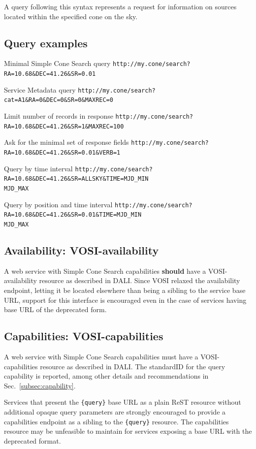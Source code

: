 \documentclass[11pt,a4paper]{ivoa} 
\begin{document}
A query following this syntax represents a request for information on
sources located within the specified cone on the sky.

\subsection{Query examples} \begin{bigdescription} \item[Minimal Simple
Cone Search query]
\nolinkurl{http://my.cone/search?RA=10.68\&DEC=41.26\&SR=0.01}
\item[Service Metadata query]
\nolinkurl{http://my.cone/search?cat=A1\&RA=0\&DEC=0\&SR=0\&MAXREC=0}
\item[Limit number of records in response]
\nolinkurl{http://my.cone/search?RA=10.68\&DEC=41.26\&SR=1\&MAXREC=100}
\item[Ask for the minimal set of response fields]
\nolinkurl{http://my.cone/search?RA=10.68\&DEC=41.26\&SR=0.01\&VERB=1}
\item[Query by time
interval]\nolinkurl{http://my.cone/search?RA=10.68\&DEC=41.26\&SR=ALLSKY&TIME=MJD\_MIN
MJD\_MAX} \item[Query by position and time
interval]\nolinkurl{http://my.cone/search?RA=10.68\&DEC=41.26\&SR=0.01&TIME=MJD\_MIN
MJD\_MAX} \end{bigdescription}

\subsection{Availability: VOSI-availability} A web service with Simple
Cone Search capabilities \textbf{should} have a VOSI-availability
resource as described in DALI. Since VOSI relaxed the availability
endpoint, letting it be located elsewhere than being a sibling to the
service base URL, support for this interface is encouraged even in the
case of services having base URL of the deprecated form.

\subsection{Capabilities: VOSI-capabilities} A web service with Simple
Cone Search capabilities must have a VOSI-capabilities resource as
described in DALI. The standardID for the {query} capability is
reported, among other details and recommendations in
Sec.~\ref{subsec:capability}.

Services that present the \texttt{\{query\}} base URL as a plain ReST
resource without additional opaque query parameters are strongly
encouraged to provide a capabilities endpoint as a sibling to the
\texttt{\{query\}} resource. The capabilities resource may be unfeasible
to maintain for services exposing a base URL with the deprecated format.
\end{document}
